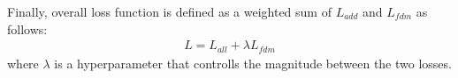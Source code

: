 Finally, overall loss function is defined as a weighted sum of $L_{add}$ and $L_{fdm}$ as follows:
\begin{equation}
\label{eq:overall}
\begin{aligned}
L = L_{all} + \lambda L_{fdm}
\end{aligned}
\end{equation}
where $\lambda$ is a hyperparameter that controlls the magnitude between the two losses.

